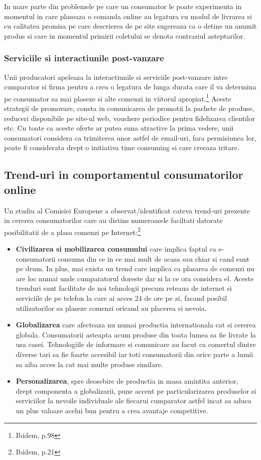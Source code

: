 \documentclass[a4paper, 12pt]{article}
\begin{document}
		\quad In mare parte din problemele pe care un consumator le poate experimenta in momentul in care plaseaza o comanda online au legatura cu  modul de livrarea si cu calitatea promisa pe care descrierea de pe site sugereaza ca o detine un anumit produs si care in momentul primirii coletului se denota contrariul asteptarilor.
		
		\subsubsection{Serviciile si interactiunile post-vanzare}
		
		\quad\quad Unii producatori apeleaza la interactiunile si serviciile post-vanzare intre cumparator si firma pentru a crea o legatura de lunga durata care il va determina pe consumator sa mai plaseze si alte comenzi in viitorul apropiat.\footnote{Ibidem, p.98} Aceste strategii de promovare, consta in comunicarea de promotii la pachete de produse, reduceri disponibile pe site-ul web, vouchere periodice pentru fidelizarea clientilor etc. Cu toate ca aceste oferte ar putea suna atractive la prima vedere, unii consumatori considera ca trimiterea unor astfel de email-uri, fara permisiunea lor, poate fi considerata drept o initiativa time consuming si care creeaza iritare.
		
		\quad\subsection{Trend-uri in comportamentul consumatorilor online} 
		Un studiu al Comisiei Europene a observat/identificat cateva trend-uri prezente in cererea consumatorilor care au distins numeroasele faciltati datorate posibilitatii de a plasa comenzi pe Internet:\footnote{Ibidem, p.21}
		\begin{itemize}
			\item \textbf{Civilizarea si mobilizarea consumului} care implica faptul ca e-consumatorii consuma din ce in ce mai mult de acasa sau chiar si cand sunt pe drum. In plus, mai exista un trend care implica ca plasarea de comenzi nu are loc numai unde cumparatorul doreste dar si la ce ora considera el. Aceste trenduri sunt facilitate de noi tehnologii precum reteaua de internet si serviciile de pe telefon la care ai acces 24 de ore pe zi, facand posibil utilizatorilor sa plaseze comenzi oricand au placerea si nevoia.
			\item \textbf{Globalizarea} care afecteaza nu numai productia internationala cat si cererea globala. Consumatorii asteapta acum produse din toata lumea sa fie livrate la usa casei. Tehnologiile de informare si comunicare au facut ca comertul dintre diverse tari sa fie foarte accesibil iar toti consumatorii din orice parte a lumii sa aiba acces la cat mai multe produse similare.
			\item \textbf{Personalizarea}, spre deosebire de productia in masa amintita anterior, drept componenta a globalizarii, pune accent pe particularizarea produselor si serviciilor la nevoile individuale ale fiecarui cumparator astfel incat sa aduca un plus valoare acelui bun pentru a crea avantaje competitive.
		\end{itemize}
		
\end{document}
